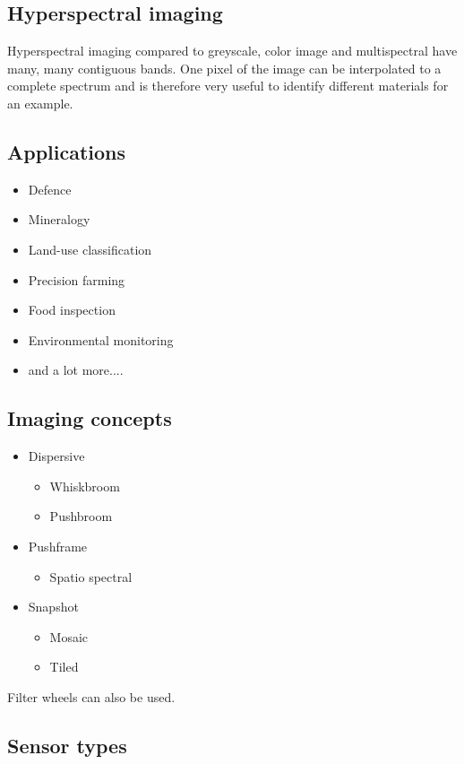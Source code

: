 	\subsection{Hyperspectral imaging}
	Hyperspectral imaging compared to greyscale, color image and multispectral have many, many contiguous bands. One pixel of the image can be interpolated to a complete spectrum and is therefore very useful to identify different materials for an example. 

	\subsection{Applications}
	\begin{itemize}
		\item Defence
		\item Mineralogy
		\item Land-use classification 
		\item Precision farming
		\item Food inspection
		\item Environmental monitoring
		\item  and a lot more....
	\end{itemize}

	\subsection{Imaging concepts}

	\begin{itemize}
		\item Dispersive
		\begin{itemize}
			\item Whiskbroom
			\item Pushbroom
		\end{itemize}
		\item Pushframe
		\begin{itemize}
			\item Spatio spectral
		\end{itemize}
		\item Snapshot
		\begin{itemize}
				\item Mosaic
				\item Tiled
			\end{itemize}	
	\end{itemize}

	Filter wheels can also be used.

	\subsection{Sensor types}
	
